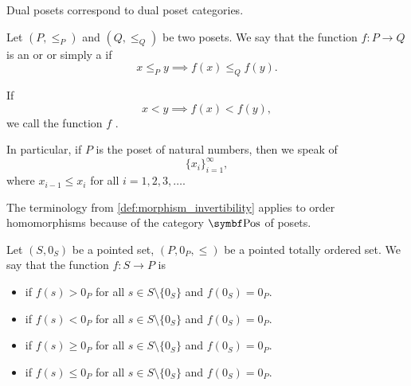 \begin{proposition}\label{thm:dual_poset_dual_poset_category}
  Dual posets correspond to dual poset categories.
\end{proposition}

\begin{definition}\label{def:monotone_map}
  Let \( (P, \leq_P) \) and \( (Q, \leq_Q) \) be two posets. We say that the function \( f: P \to Q \) is an  or  or simply a  if
  \begin{equation*}
    x \leq_P y \implies f(x) \leq_Q f(y).
  \end{equation*}

  If
  \begin{equation*}
    x < y \implies f(x) < f(y),
  \end{equation*}
  we call the function \( f \) .

  In particular, if \( P \) is the poset of natural numbers, then we speak of 
  \begin{equation*}
    \{ x_i \}_{i=1}^\infty,
  \end{equation*}
  where \( x_{i-1} \leq x_i \) for all \( i = 1, 2, 3, \ldots \).

  The terminology from \cref{def:morphism_invertibility} applies to order homomorphisms because of the category \( \Cat{Pos} \) of posets.
\end{definition}

\begin{definition}\label{def:function_definiteness}
  Let \( (S, 0_S) \) be a pointed set, \( (P, 0_P, \leq) \) be a pointed totally ordered set. We say that the function \( f: S \to P \) is
  \begin{itemize}
    \item {} if \( f(s) > 0_P \) for all \( s \in S \setminus \{ 0_S \} \) and \( f(0_S) = 0_P \).
    \item {} if \( f(s) < 0_P \) for all \( s \in S \setminus \{ 0_S \} \) and \( f(0_S) = 0_P \).
    \item {} if \( f(s) \geq 0_P \) for all \( s \in S \setminus \{ 0_S \} \) and \( f(0_S) = 0_P \).
    \item {} if \( f(s) \leq 0_P \) for all \( s \in S \setminus \{ 0_S \} \) and \( f(0_S) = 0_P \).
  \end{itemize}
\end{definition}

